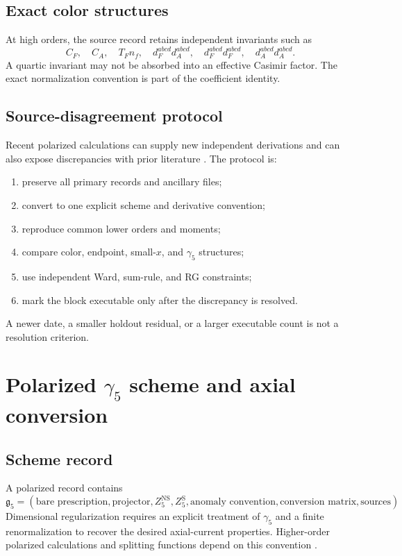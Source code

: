 \documentclass[11pt]{article}
\newcommand{\NS}{\mathrm{NS}}
\newcommand{\sing}{\mathrm{S}}
\begin{document}
\subsection{Exact color structures}

At high orders, the source record retains independent invariants such as
\begin{equation}
 C_F,
 \quad C_A,
 \quad T_Fn_f,
 \quad d_F^{abcd}d_A^{abcd},
 \quad d_F^{abcd}d_F^{abcd},
 \quad d_A^{abcd}d_A^{abcd}.
 \label{eq:color-invariants}
\end{equation}
A quartic invariant may not be absorbed into an effective Casimir factor.  The exact normalization convention is part of the coefficient identity.

\subsection{Source-disagreement protocol}

Recent polarized calculations can supply new independent derivations and can also expose discrepancies with prior literature \cite{ZhuDGLAP2026}.  The protocol is:
\begin{enumerate}
\item preserve all primary records and ancillary files;
\item convert to one explicit scheme and derivative convention;
\item reproduce common lower orders and moments;
\item compare color, endpoint, small-\(x\), and \(\gamma_5\) structures;
\item use independent Ward, sum-rule, and RG constraints;
\item mark the block executable only after the discrepancy is resolved.
\end{enumerate}
A newer date, a smaller holdout residual, or a larger executable count is not a resolution criterion.

\section{Polarized \texorpdfstring{\(\gamma_5\)}{gamma5} scheme and axial conversion}
\label{sec:gamma5}

\subsection{Scheme record}

A polarized record contains
\begin{equation}
 \mathfrak g_5=
 \left(
 \text{bare prescription},
 \text{projector},
 Z_5^{\NS},
 Z_5^{\sing},
 \text{anomaly convention},
 \text{conversion matrix},
 \text{sources}
 \right).
 \label{eq:gamma5-record}
\end{equation}
Dimensional regularization requires an explicit treatment of \(\gamma_5\) and a finite renormalization to recover the desired axial-current properties.  Higher-order polarized calculations and splitting functions depend on this convention \cite{MochVermaserenVogt2014,MochVermaserenVogt2015,BehringEtAl2019}.
\end{document}
